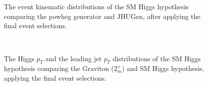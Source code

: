 \begin{figure}[!hbtp]
{}\\
\\
\caption{The event kinematic distributions of the SM Higgs hypothesis 
comparing the powheg generator and JHUGen, after 
applying the final event selections. 
}
\label{fig:higgskin_0j}
\end{figure}

\begin{figure}[!hbtp]
\centering
{}
\\
\caption{The Higgs $p_T$ and the leading jet $p_T$ distributions of the 
SM Higgs hypothesis comparing the Graviton ($2_m^+$) and SM Higgs hypothesis, 
applying the final event selections. 
}
\label{fig:gravvshiggspt_0j}
\end{figure}

